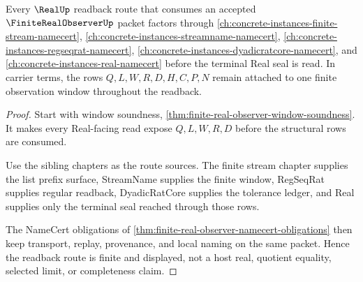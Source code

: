 \begin{theorem}
\label{thm:finite-real-observer-real-readback-route}
Every $\RealUp$ readback route that consumes an accepted $\FiniteRealObserverUp$ packet factors through \autoref{ch:concrete-instances-finite-stream-namecert}, \autoref{ch:concrete-instances-streamname-namecert}, \autoref{ch:concrete-instances-regseqrat-namecert}, \autoref{ch:concrete-instances-dyadicratcore-namecert}, and \autoref{ch:concrete-instances-real-namecert} before the terminal Real seal is read. In carrier terms, the rows $Q,L,W,R,D,H,C,P,N$ remain attached to one finite observation window throughout the readback.
\end{theorem}
\begin{proof}
Start with window soundness, \autoref{thm:finite-real-observer-window-soundness}. It makes every Real-facing read expose $Q,L,W,R,D$ before the structural rows are consumed.

Use the sibling chapters as the route sources. The finite stream chapter supplies the list prefix surface, StreamName supplies the finite window, RegSeqRat supplies regular readback, DyadicRatCore supplies the tolerance ledger, and Real supplies only the terminal seal reached through those rows.

The NameCert obligations of \autoref{thm:finite-real-observer-namecert-obligations} then keep transport, replay, provenance, and local naming on the same packet. Hence the readback route is finite and displayed, not a host real, quotient equality, selected limit, or completeness claim.
\end{proof}




